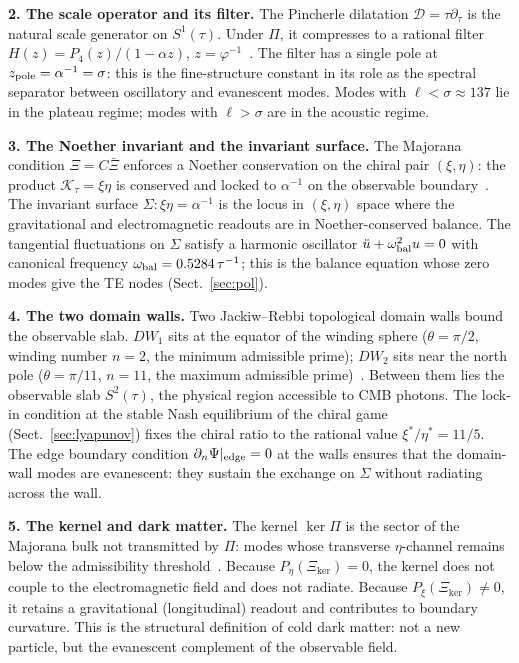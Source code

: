\documentclass[twocolumn,10pt]{article}
\newcommand{\vp}{\varphi}
\newcommand{\Ktau}{\mathcal{K}_\tau}
\newcommand{\obal}{\omega_{\rm bal}}
\newcommand{\kerPi}{\ker\Pi}
\begin{document}
\smallskip
\noindent\textbf{2. The scale operator and its filter.}
The Pincherle dilatation $\mathcal{D}=\tau\partial_\tau$ is the
natural scale generator on $S^1(\tau)$. Under $\Pi$, it compresses
to a rational filter
$H(z)=P_4(z)/(1-\alpha z)$, $z=\vp^{-1}$~\cite{CamP09,CamP11}.
The filter has a single pole at $z_{\rm pole}=\alpha^{-1}=\sigma$:
this is the fine-structure constant in its role as the spectral
separator between oscillatory and evanescent modes. Modes with
$\ell<\sigma\approx137$ lie in the plateau regime; modes with
$\ell>\sigma$ are in the acoustic regime.

\smallskip
\noindent\textbf{3. The Noether invariant and the invariant surface.}
The Majorana condition $\Xi=C\bar\Xi$ enforces a Noether conservation
on the chiral pair $(\xi,\eta)$: the product $\Ktau=\xi\eta$ is
conserved and locked to $\alpha^{-1}$ on the observable
boundary~\cite{CamP06}. The invariant surface
$\Sigma:\xi\eta=\alpha^{-1}$ is the locus in $(\xi,\eta)$ space
where the gravitational and electromagnetic readouts are in
Noether-conserved balance. The tangential fluctuations on $\Sigma$
satisfy a harmonic oscillator $\ddot u+\obal^2 u=0$ with canonical
frequency $\obal=0.5284\,\tau^{-1}$; this is the balance equation
whose zero modes give the TE nodes (Sect.~\ref{sec:pol}).

\smallskip
\noindent\textbf{4. The two domain walls.}
Two Jackiw--Rebbi topological domain walls bound the observable slab.
$DW_1$ sits at the equator of the winding sphere
($\theta=\pi/2$, winding number $n=2$, the minimum admissible
prime); $DW_2$ sits near the north pole ($\theta=\pi/11$, $n=11$,
the maximum admissible prime)~\cite{CamKer163}. Between them lies
the observable slab $S^2(\tau)$, the physical region accessible to
CMB photons. The lock-in condition at the stable Nash equilibrium of
the chiral game (Sect.~\ref{sec:lyapunov}) fixes the chiral ratio to
the rational value $\xi^*/\eta^*=11/5$.
The edge boundary condition $\partial_n\Psi|_{\rm edge}=0$ at the
walls ensures that the domain-wall modes are evanescent: they sustain
the exchange on $\Sigma$ without radiating across the wall.

\smallskip
\noindent\textbf{5. The kernel and dark matter.}
The kernel $\kerPi$ is the sector of the Majorana bulk not
transmitted by $\Pi$: modes whose transverse $\eta$-channel remains
below the admissibility threshold~\cite{CamP11}. Because
$P_\eta(\Xi_{\ker})=0$, the kernel does not couple to the
electromagnetic field and does not radiate. Because
$P_\xi(\Xi_{\ker})\neq0$, it retains a gravitational (longitudinal)
readout and contributes to boundary curvature. This is the structural
definition of cold dark matter: not a new particle, but the
evanescent complement of the observable field.
\end{document}
